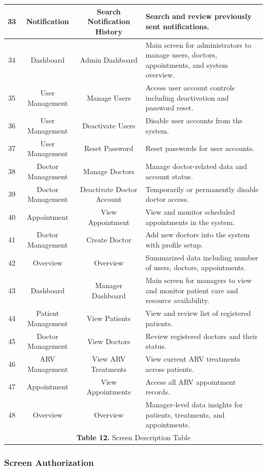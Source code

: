 \documentclass[12pt,a4paper]{article}
\begin{document}
\begin{longtable}{|c|c|c|p{8.5cm}|}
\hline
33 & Notification & Search Notification History & Search and review previously sent notifications. \\
\hline
34 & Dashboard & Admin Dashboard & Main screen for administrators to manage users, doctors, appointments, and system overview. \\
\hline
35 & User Management & Manage Users & Access user account controls including deactivation and password reset. \\
\hline
36 & User Management & Deactivate Users & Disable user accounts from the system. \\
\hline
37 & User Management & Reset Password & Reset passwords for user accounts. \\
\hline
38 & Doctor Management & Manage Doctors & Manage doctor-related data and account status. \\
\hline
39 & Doctor Management & Deactivate Doctor Account & Temporarily or permanently disable doctor access. \\
\hline
40 & Appointment & View Appointment & View and monitor scheduled appointments in the system. \\
\hline
41 & Doctor Management & Create Doctor & Add new doctors into the system with profile setup. \\
\hline
42 & Overview & Overview & Summarized data including number of users, doctors, appointments. \\
\hline
43 & Dashboard & Manager Dashboard & Main screen for managers to view and monitor patient care and resource availability. \\
\hline
44 & Patient Management & View Patients & View and review list of registered patients. \\
\hline
45 & Doctor Management & View Doctors & Review registered doctors and their status. \\
\hline
46 & ARV Management & View ARV Treatments & View current ARV treatments across patients. \\
\hline
47 & Appointment & View Appointments & Access all ARV appointment records. \\
\hline
48 & Overview & Overview & Manager-level data insights for patients, treatments, and appointments. \\
\hline
\multicolumn{4}{|c|}{\textbf{Table 12.} Screen Description Table} \\
\hline
\end{longtable}



\subsubsection{Screen Authorization}
\end{document}
